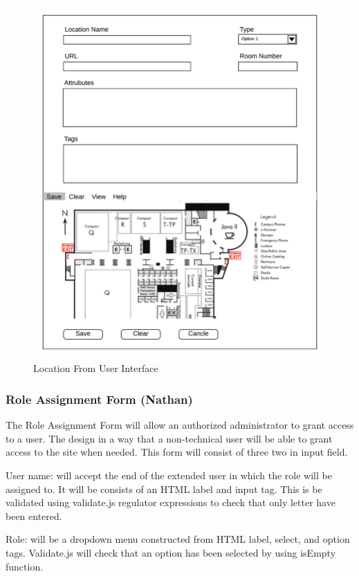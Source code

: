 \documentclass[letterpaper,10pt,titlepage, onecolumn, compsoc]{IEEEtran}
\begin{document}
\begin{figure}[h!]
\centering
\includegraphics[scale=.45\textwidth,natwidth=2250,natheight=2708]{images/location-form.png}
\caption{Location From User Interface}
\label{fig:method}
\end{figure}

\subsubsection{Role Assignment Form (Nathan)}
The Role Assignment Form will allow an authorized administrator to grant access to a user. The design in a way that a non-technical user will be able to grant access to the site when needed. This form will consist of three two in input field. 

User name: will accept the end of the extended user in which the role will be assigned to.  It will be consists of an HTML label and input tag. This is be validated using validate.js regulator expressions to check that only letter have been entered.

Role: will be a dropdown menu constructed from HTML label, select, and option tags. Validate.js will check that an option has been selected by using isEmpty function.  
\end{document}
